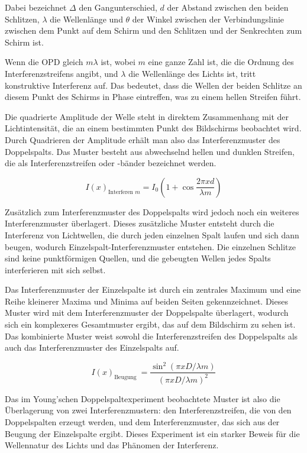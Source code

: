 \documentclass[12pt,english,ngerman]{scrartcl}
\begin{document}

Dabei bezeichnet $\Delta$ den Gangunterschied, $d$ der Abstand zwischen den beiden Schlitzen, $\lambda$ die Wellenlänge
und $\theta$ der Winkel zwischen der
Verbindungslinie zwischen dem Punkt auf dem Schirm und den Schlitzen und der
Senkrechten zum Schirm ist.

Wenn die OPD gleich $m \lambda$ ist, wobei $m$ eine ganze Zahl ist, die die Ordnung des
Interferenzstreifens angibt, und $\lambda$ die Wellenlänge des Lichts ist, tritt
konstruktive Interferenz auf. Das bedeutet, dass die Wellen der beiden Schlitze
an diesem Punkt des Schirms in Phase eintreffen, was zu einem hellen Streifen
führt.

Die quadrierte Amplitude der Welle steht in direktem Zusammenhang mit der
Lichtintensität, die an einem bestimmten Punkt des Bildschirms beobachtet wird.
Durch Quadrieren der Amplitude erhält man also das Interferenzmuster des
Doppelspalts. Das Muster besteht aus abwechselnd hellen und dunklen Streifen,
die als Interferenzstreifen oder -bänder bezeichnet werden.

\begin{equation}
	I(x)_{\text {Interferen } m}=I_0\left(1+\cos \frac{2 \pi x d}{\lambda m}\right)
\end{equation}


Zusätzlich zum Interferenzmuster des Doppelspalts wird jedoch noch ein weiteres
Interferenzmuster überlagert. Dieses zusätzliche Muster entsteht durch die
Interferenz von Lichtwellen, die durch jeden einzelnen Spalt laufen und sich
dann beugen, wodurch Einzelspalt-Interferenzmuster entstehen. Die einzelnen
Schlitze sind keine punktförmigen Quellen, und die gebeugten Wellen jedes
Spalts interferieren mit sich selbst.

Das Interferenzmuster der Einzelspalte ist durch ein zentrales Maximum und eine
Reihe kleinerer Maxima und Minima auf beiden Seiten gekennzeichnet. Dieses
Muster wird mit dem Interferenzmuster der Doppelspalte überlagert, wodurch sich
ein komplexeres Gesamtmuster ergibt, das auf dem Bildschirm zu sehen ist. Das
kombinierte Muster weist sowohl die Interferenzstreifen des Doppelspalts als
auch das Interferenzmuster des Einzelspalts auf.

\begin{equation}
	I(x)_{\text {Beugung }}=\frac{\sin ^2(\pi x D / \lambda m)}{(\pi x D / \lambda m)^2}
\end{equation}

Das im Young'schen Doppelspaltexperiment beobachtete Muster ist also die
Überlagerung von zwei Interferenzmustern: den Interferenzstreifen, die von den
Doppelspalten erzeugt werden, und dem Interferenzmuster, das sich aus der
Beugung der Einzelspalte ergibt. Dieses Experiment ist ein starker Beweis für
die Wellennatur des Lichts und das Phänomen der Interferenz.
\end{document}
